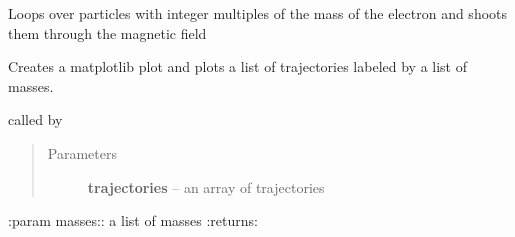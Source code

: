 \documentclass[letterpaper,10pt,english]{sphinxmanual}
\begin{document}

\begin{fulllineitems}
\label{index:electronTrajectory.main}
Loops over particles with integer multiples of the mass of the
electron and shoots them through the magnetic field

\end{fulllineitems}


\begin{fulllineitems}
\label{index:electronTrajectory.plot_trajectory}
Creates a matplotlib plot and plots a list of trajectories labeled
by a list of masses.




called by {\hyperref[index:electronTrajectory.main]{}}


\begin{quote}\begin{description}
\item[{Parameters}] \leavevmode
\textbf{trajectories} -- an array of trajectories

\end{description}\end{quote}

:param masses:: a list of masses
:returns: 

\end{fulllineitems}

\end{document}
